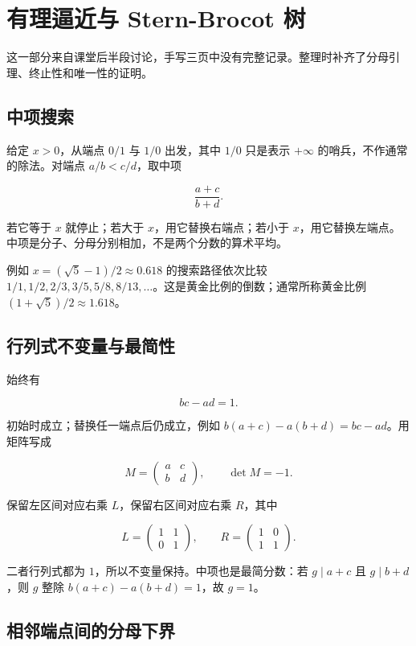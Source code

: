 \section{有理逼近与 Stern-Brocot 树}


这一部分来自课堂后半段讨论，手写三页中没有完整记录。整理时补齐了分母引理、终止性和唯一性的证明。

\subsection{中项搜索}


给定 $x>0$，从端点 $0/1$ 与 $1/0$ 出发，其中 $1/0$ 只是表示 $+\infty$ 的哨兵，不作通常的除法。对端点 $a/b<c/d$，取中项

\[
\frac{a+c}{b+d}.
\]

若它等于 $x$ 就停止；若大于 $x$，用它替换右端点；若小于 $x$，用它替换左端点。中项是分子、分母分别相加，不是两个分数的算术平均。

例如 $x=(\sqrt5-1)/2\approx0.618$ 的搜索路径依次比较 $1/1,1/2,2/3,3/5,5/8,8/13,\ldots$。这是黄金比例的倒数；通常所称黄金比例 $(1+\sqrt5)/2\approx1.618$。

\subsection{行列式不变量与最简性}


始终有

\[
bc-ad=1.
\]

初始时成立；替换任一端点后仍成立，例如 $b(a+c)-a(b+d)=bc-ad$。用矩阵写成

\[
M=\begin{pmatrix}a&c\\b&d\end{pmatrix},\qquad\det M=-1.
\]

保留左区间对应右乘 $L$，保留右区间对应右乘 $R$，其中

\[
L=\begin{pmatrix}1&1\\0&1\end{pmatrix},\qquad
R=\begin{pmatrix}1&0\\1&1\end{pmatrix}.
\]

二者行列式都为 $1$，所以不变量保持。中项也是最简分数：若 $g\mid a+c$ 且 $g\mid b+d$，则 $g$ 整除 $b(a+c)-a(b+d)=1$，故 $g=1$。

\subsection{相邻端点间的分母下界}



